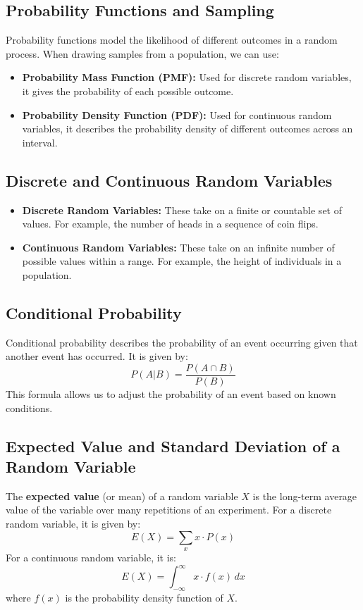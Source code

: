 \documentclass{article}
\begin{document}
\subsection*{Probability Functions and Sampling}
Probability functions model the likelihood of different outcomes in a random process. When drawing samples from a population, we can use:
\begin{itemize}
    \item \textbf{Probability Mass Function (PMF):} Used for discrete random variables, it gives the probability of each possible outcome.
    \item \textbf{Probability Density Function (PDF):} Used for continuous random variables, it describes the probability density of different outcomes across an interval.
\end{itemize}

\subsection*{Discrete and Continuous Random Variables}
\begin{itemize}
    \item \textbf{Discrete Random Variables:} These take on a finite or countable set of values. For example, the number of heads in a sequence of coin flips.
    \item \textbf{Continuous Random Variables:} These take on an infinite number of possible values within a range. For example, the height of individuals in a population.
\end{itemize}

\subsection*{Conditional Probability}
Conditional probability describes the probability of an event occurring given that another event has occurred. It is given by:
\[
P(A|B) = \frac{P(A \cap B)}{P(B)}
\]
This formula allows us to adjust the probability of an event based on known conditions.

\subsection*{Expected Value and Standard Deviation of a Random Variable}
The \textbf{expected value} (or mean) of a random variable $X$ is the long-term average value of the variable over many repetitions of an experiment. For a discrete random variable, it is given by:
\[
E(X) = \sum_{x} x \cdot P(x)
\]
For a continuous random variable, it is:
\[
E(X) = \int_{-\infty}^{\infty} x \cdot f(x) \, dx
\]
where $f(x)$ is the probability density function of $X$.
\end{document}
